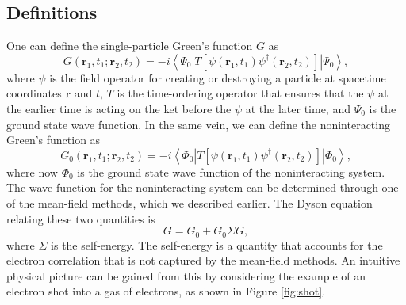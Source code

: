 \documentclass[12pt]{caltech_thesis}
\begin{document}
\subsection{Definitions}
One can define the single-particle Green's function $G$ as
\begin{equation}
G\left(\mathbf{r}_1, t_1 ; \mathbf{r}_2, t_2\right)=-i\left\langle\Psi_0\left|T\left[\psi\left(\mathbf{r}_1, t_1\right) \psi^{\dagger}\left(\mathbf{r}_2, t_2\right)\right]\right| \Psi_0\right\rangle,
\end{equation}
where $\psi$ is the field operator for creating or destroying a particle at spacetime coordinates $\mathbf{r}$ and $t$, $T$ is the time-ordering operator that ensures that the $\psi$ at the earlier time is acting on the ket before the $\psi$ at the later time, and $\Psi_0$ is the ground state wave function. In the same vein, we can define the noninteracting Green's function as
\begin{equation}
G_0\left(\mathbf{r}_1, t_1 ; \mathbf{r}_2, t_2\right)=-i\left\langle\Phi_0\left|T\left[\psi\left(\mathbf{r}_1, t_1\right) \psi^{\dagger}\left(\mathbf{r}_2, t_2\right)\right]\right| \Phi_0\right\rangle,
\end{equation}
where now $\Phi_0$ is the ground state wave function of the noninteracting system. The wave function for the noninteracting system can be determined through one of the mean-field methods, which we described earlier. The Dyson equation relating these two quantities is
\begin{equation}
G=G_0+G_0\Sigma G,
\label{eqn:dyson}
\end{equation}
where $\Sigma$ is the self-energy. The self-energy is a quantity that accounts for the electron correlation that is not captured by the mean-field methods. An intuitive physical picture can be gained from this by considering the example of an electron shot into a gas of electrons, as shown in Figure \ref{fig:shot}.
\end{document}

